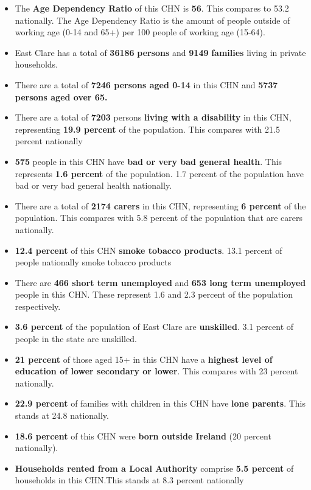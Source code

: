 \documentclass{article}
\begin{document}
\begin{itemize}

\item The \textbf{Age Dependency Ratio} of this CHN is  \textbf{56}. This compares to 53.2 nationally. The Age Dependency Ratio is the amount of people outside of working age (0-14 and 65+) per 100 people of working age (15-64). 

\item East Clare has a total of \textbf{\num{36186}} \textbf{persons} and  \textbf{\num{9149}} \textbf{families} living in private households.

\item There are a total of \textbf{\num{7246} persons aged 0-14} in this CHN and \textbf{\num{5737} persons aged over 65.} 

\item There are a total of \textbf{\num{7203}} persons \textbf{living with a disability} in this CHN, representing \textbf{19.9 percent} of the population. This compares with  21.5 percent nationally

\item \textbf{\num{575}} people in this CHN have \textbf{bad or very bad general health}. This represents \textbf{1.6 percent} of the population. 1.7 percent of the population have bad or very bad general health nationally. 

\item There are a total of \textbf{\num{2174} carers} in this CHN, representing \textbf{6 percent} of the population. This compares with 5.8 percent of the population that are carers nationally. 

\item \textbf{12.4 percent} of this CHN \textbf{smoke tobacco products}. 13.1 percent of people nationally smoke tobacco products

\item There are \textbf{\num{466} short term unemployed} and \textbf{\num{653} long term unemployed} people in this CHN. These represent 1.6 and 2.3 percent of the population respectively.

\item  \textbf{3.6 percent} of the population of East Clare are \textbf{unskilled}. 3.1 percent of people in the state are unskilled.

\item \textbf{21 percent} of those aged 15+ in this CHN have a \textbf{highest level of education of lower secondary or lower}. This compares with 23 percent nationally. 

\item \textbf{22.9 percent} of families with children in this CHN have \textbf{lone parents}. This stands at 24.8 nationally.

\item \textbf{18.6 percent} of this CHN were \textbf{born outside Ireland} (20 percent nationally).

\item \textbf{Households rented from a Local Authority} comprise \textbf{5.5 percent} of households in this CHN.This stands at 8.3 percent nationally

\end{itemize}
\end{document}
